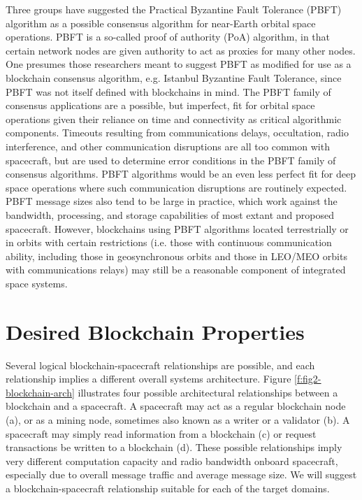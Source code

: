 \documentclass[]{aiaa-tc}%
\begin{document}
Three groups have suggested the Practical Byzantine Fault Tolerance (PBFT) algorithm\cite{castro_practical_1999} as a possible consensus algorithm for near-Earth orbital space operations\cite{yu_blockchain_2019,molesky_blockchain_2018,mital_blockchain_2019}. PBFT is a so-called proof of authority (PoA) algorithm, in that certain network nodes are given authority to act as proxies for many other nodes. One presumes those researchers meant to suggest PBFT as modified for use as a blockchain consensus algorithm, e.g. Istanbul Byzantine Fault Tolerance\cite{lin_istanbul_2017}, since PBFT was not itself defined with blockchains in mind. The PBFT family of consensus applications are a 
possible, but imperfect, fit for orbital space operations given their reliance on time and connectivity as critical algorithmic components. Timeouts resulting from communications delays, occultation, radio interference, and other communication disruptions are all too common with spacecraft, but are used to determine error conditions in the PBFT family of consensus algorithms. PBFT algorithms would be an even less perfect fit for deep space operations where such communication disruptions are routinely expected. PBFT message sizes also tend to be large in practice, which work against the bandwidth, processing, and storage capabilities of most extant and proposed spacecraft. However, blockchains using PBFT algorithms located terrestrially or in orbits with certain restrictions (i.e. those with continuous communication ability, including those in geosynchronous orbits and those in LEO/MEO orbits with communications relays) may still be a reasonable component of integrated space systems.


\section{Desired Blockchain Properties}\label{sec:desiredproperties}

Several logical blockchain-spacecraft relationships are possible, and each relationship implies a different overall systems architecture. Figure \ref{f:fig2-blockchain-arch} illustrates four possible architectural relationships between a blockchain and a spacecraft. A spacecraft may act as a regular blockchain node (a), or as a mining node, sometimes also known as a writer or a 
validator
 (b). A spacecraft may simply read information from a blockchain (c) or request transactions be written to a blockchain (d). These possible relationships imply very different computation capacity and radio bandwidth onboard spacecraft, especially due to overall message traffic and average message size. We will suggest a blockchain-spacecraft relationship suitable for each of the target domains.
\end{document}

